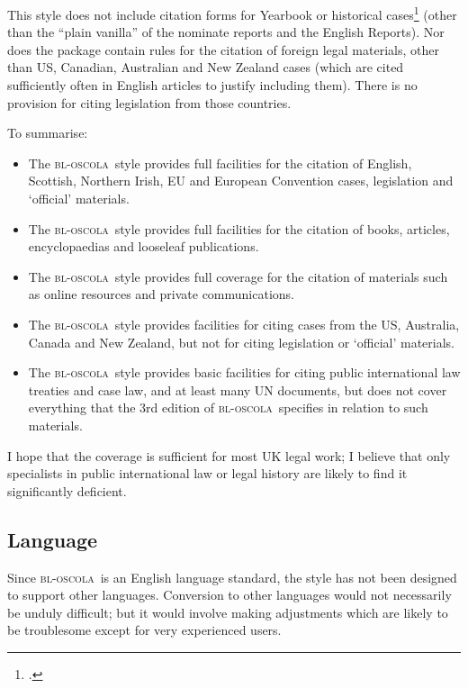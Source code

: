 \documentclass[a4paper,
               11pt,
	       DIV=1,			   
	       footinclude=false]
	      {scrartcl}
\newcommand{\oscola}{\textsc{bl-oscola}}
\begin{document}
This style
does not include citation forms for Yearbook or historical
cases\footcite[20--21]{oscola} (other than the \enquote{plain vanilla}
of the nominate reports and the English Reports). Nor does the package
contain rules for the citation of foreign legal materials, other than US,
Canadian, Australian and New Zealand cases (which are cited
sufficiently often in English articles to justify including
them). There is no provision for citing legislation from those
countries.

To summarise:
\begin{itemize}
\item The \oscola\ style provides full facilities for the citation of
  English, Scottish, Northern Irish, EU and European Convention cases,
  legislation and `official' materials.
\item The \oscola\ style provides full facilities for the citation
  of books, articles, encyclopaedias and looseleaf publications.
\item The \oscola\ style provides full coverage for the citation of
  materials such as online resources and private communications.
\item The \oscola\ style provides facilities for citing cases from
  the US, Australia, Canada and New Zealand, but not for citing
  legislation or `official' materials.
\item The \oscola\ style provides basic facilities for citing public
  international law treaties and case law, and at least many UN
  documents, but does not cover everything that the 3rd edition of
  \oscola\ specifies in relation to such materials.
\end{itemize}
I hope that the coverage is sufficient for most UK legal work; I
believe that only specialists in public international law or legal
history are likely to find it significantly deficient.

\subsection{Language}

Since \oscola\ is an English language
standard, the style has not been designed to support other
languages. Conversion to other languages would not necessarily be
unduly difficult; but it would involve making adjustments which are
likely to be troublesome except for very experienced users.
\end{document}
